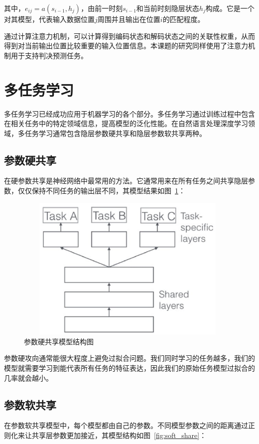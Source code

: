 其中，$e_{ij}=a(s_{i-1},h_j)$，由前一时刻$s_{i-1}$和当前时刻隐层状态$h_j$构成。它是一个对其模型，代表输入数据位置$j$周围并且输出在位置$i$的匹配程度。

通过计算注意力机制，可以计算得到编码状态和解码状态之间的关联性权重，从而得到对当前输出位置比较重要的输入位置信息。本课题的研究同样使用了注意力机制用于支持判决预测任务。

\section{多任务学习}

多任务学习已经成功应用于机器学习的各个部分。多任务学习通过训练过程中包含在相关任务中的特定领域信息，提高模型的泛化性能。在自然语言处理深度学习领域，多任务学习通常包含隐层参数硬共享和隐层参数软共享两种。

\subsection{参数硬共享}
在硬参数共享是神经网络中最常用的方法。它通常用来在所有任务之间共享隐层参数，仅仅保持不同任务的输出层不同，其模型结果如图~\ref{fig:hard_share}：

\begin{figure}[htb]
    \centering
    \includegraphics[width=11cm,height=7cm, clip=true]{./sources/hard_share.eps}
    \vspace{-10pt}
    \caption{\label{fig:hard_share} 参数硬共享模型结构图}
    \vspace{-5pt}
\end{figure}


参数硬攻向通常能很大程度上避免过拟合问题。我们同时学习的任务越多，我们的模型就需要学习到能代表所有任务的特征表达，因此我们的原始任务模型过拟合的几率就会越小。

\subsection{参数软共享}
在参数软共享模型中，每个模型都由自己的参数。不同模型参数之间的距离通过正则化来让共享层参数更加接近，其模型结构如图~\ref{fig:soft_share}：

